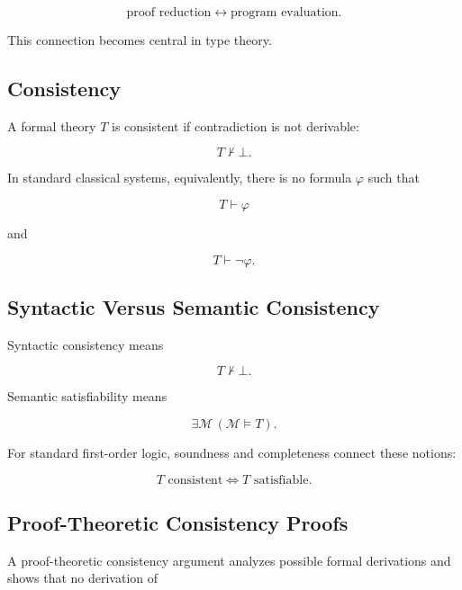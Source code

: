 \[
\boxed{
\text{proof reduction}
\leftrightarrow
\text{program evaluation}.
}
\]

This connection becomes central in type theory.

\subsection{Consistency}
\label{subsec:proof-theoretic-consistency}

A formal theory \(T\) is consistent if contradiction is not derivable:

\[
\boxed{
T\nvdash\bot.
}
\]

In standard classical systems, equivalently, there is no formula
\(\varphi\) such that

\[
T\vdash\varphi
\]

and

\[
T\vdash\neg\varphi.
\]

\subsection{Syntactic Versus Semantic Consistency}
\label{subsec:syntactic-semantic-consistency}

Syntactic consistency means

\[
\boxed{
T\nvdash\bot.
}
\]

Semantic satisfiability means

\[
\boxed{
\exists\mathcal{M}
\,
(\mathcal{M}\models T).
}
\]

For standard first-order logic, soundness and completeness connect these
notions:

\[
\boxed{
T
\text{ consistent}
\iff
T
\text{ satisfiable}.
}
\]

\subsection{Proof-Theoretic Consistency Proofs}
\label{subsec:proof-theoretic-consistency-proofs}

A proof-theoretic consistency argument analyzes possible formal derivations
and shows that no derivation of

